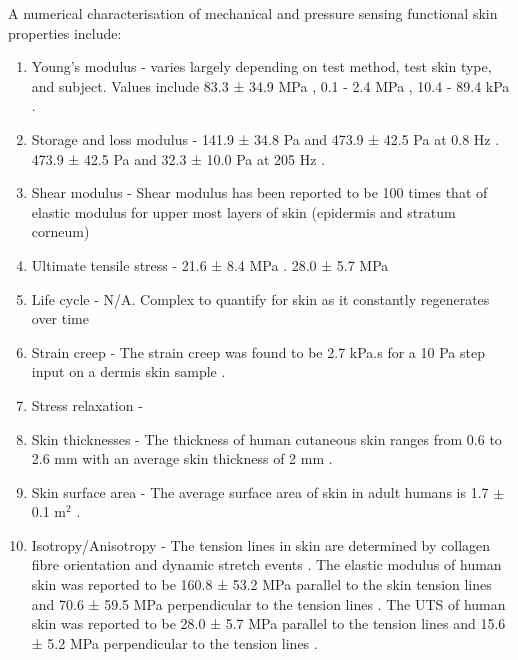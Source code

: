 A numerical characterisation of mechanical and pressure sensing functional skin properties include:
\begin{enumerate}
    \item Young's modulus -  varies largely depending on test method, test skin type, and subject. Values include 83.3 ± 34.9 MPa \cite{Annaidh2012}, 0.1 - 2.4 MPa \cite{Khaothong2010}, 10.4 - 89.4 kPa \cite{Zheng1999}.
    \item Storage and loss modulus - 141.9 ± 34.8 Pa and 473.9 ± 42.5 Pa at 0.8 Hz \cite{Holt2008}. 473.9 ± 42.5 Pa and 32.3 ± 10.0 Pa at 205 Hz \cite{Parvini2022}.
    \item Shear modulus - Shear modulus has been reported to be 100 times that of elastic modulus for upper most layers of skin (epidermis and stratum corneum) \cite{Geerligs2010}
    \item Ultimate tensile stress - 21.6 ± 8.4 MPa \cite{Annaidh2012}. 28.0 ± 5.7 MPa \cite{Ottenio2015}
    \item Life cycle - N/A. Complex to quantify for skin as it constantly regenerates over time
    \item Strain creep - The strain creep was found to be 2.7 kPa.s for a 10 Pa step input on a dermis skin sample \cite{Holt2008}.
    \item Stress relaxation - 
    \item Skin thicknesses - The thickness of human cutaneous skin ranges from 0.6 to 2.6 mm with an average skin thickness of 2 mm \cite{Landry2021}.
    \item Skin surface area - The average surface area of skin in adult humans is 1.7 $\pm$ 0.1 m$^2$ \cite{Landry2021}.
    \item Isotropy/Anisotropy - The tension lines in skin are determined by collagen fibre orientation and dynamic stretch events \cite{Newell2007,Paul2018}. The elastic modulus of human skin was reported to be 160.8 ± 53.2 MPa parallel to the skin tension lines and 70.6 ± 59.5 MPa perpendicular to the tension lines \cite{Ottenio2015}. The UTS of human skin was reported to be 28.0 ± 5.7 MPa parallel to the tension lines and 15.6 ± 5.2 MPa perpendicular to the tension lines \cite{Ottenio2015}.


\end{enumerate}
